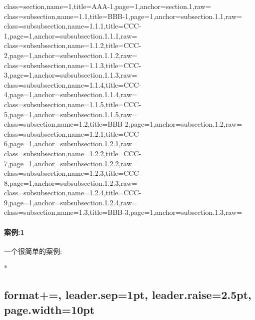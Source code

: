 \def\exampleUR{\texttt{data.ptoc}}
\begin{DocExample}[++]
class={section},name={1},title={AAA-1},page={1},anchor={section.1},raw={}
class={subsection},name={1.1},title={BBB-1},page={1},anchor={subsection.1.1},raw={}
class={subsubsection},name={1.1.1},title={CCC-1},page={1},anchor={subsubsection.1.1.1},raw={}
class={subsubsection},name={1.1.2},title={CCC-2},page={1},anchor={subsubsection.1.1.2},raw={}
class={subsubsection},name={1.1.3},title={CCC-3},page={1},anchor={subsubsection.1.1.3},raw={}
class={subsubsection},name={1.1.4},title={CCC-4},page={1},anchor={subsubsection.1.1.4},raw={}
class={subsubsection},name={1.1.5},title={CCC-5},page={1},anchor={subsubsection.1.1.5},raw={}
class={subsection},name={1.2},title={BBB-2},page={1},anchor={subsection.1.2},raw={}
class={subsubsection},name={1.2.1},title={CCC-6},page={1},anchor={subsubsection.1.2.1},raw={}
class={subsubsection},name={1.2.2},title={CCC-7},page={1},anchor={subsubsection.1.2.2},raw={}
class={subsubsection},name={1.2.3},title={CCC-8},page={1},anchor={subsubsection.1.2.3},raw={}
class={subsubsection},name={1.2.4},title={CCC-9},page={1},anchor={subsubsection.1.2.4},raw={}
class={subsection},name={1.3},title={BBB-3},page={1},anchor={subsection.1.3},raw={}
\end{DocExample}
\resetExampleUR



\clearpage
\paragraph{案例:1} 一个很简单的案例:

\begin{DocExample}*
\begingroup
\ztocformat\subsection
  {
    format+=\color{teal}, 
    leader.sep=1pt, 
    leader.raise=2.5pt, 
    page.width=10pt
  }
%
  {%
    \begin{framed}%
    \qquad\rule[-5em]{.5pt}{10em}%
    \begin{minipage}{.75\linewidth}%
  }
\ztocgroupinsert{subsection,1,end}%
  {%
    \end{minipage}%
    \end{framed}%
  }
\endgroup
\end{DocExample}

